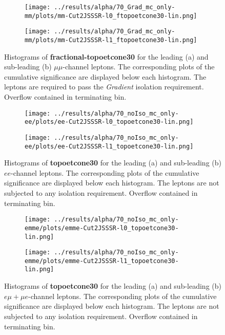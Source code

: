 \begin{figure}
\centering
\begin{subfigure}{.65\textwidth}
  \centering
  \texttt{[image: ../results/alpha/70\_Grad\_mc\_only-mm/plots/mm-Cut2JSSSR-l0\_ftopoetcone30-lin.png]}
  \caption{}
  \label{mm_leading_topoetcone}
\end{subfigure}
\begin{subfigure}{.65\textwidth}
 \centering
  \texttt{[image: ../results/alpha/70\_Grad\_mc\_only-mm/plots/mm-Cut2JSSSR-l1\_ftopoetcone30-lin.png]}
  \caption{}
  \label{mm_subleading_topoetcone}
\end{subfigure}
\caption{Histograms of \textbf{fractional-topoetcone30} for the leading (a) and sub-leading (b) $\mu\mu$-channel leptons. The corresponding plots of the cumulative significance are displayed below each histogram. The leptons are required to pass the \textit{Gradient} isolation requirement. Overflow contained in terminating bin.}
\label{ftopoetcone30_isoplots_wGrad_mm}
\end{figure}
\begin{figure}
\centering
\begin{subfigure}{.65\textwidth}
  \centering
  \texttt{[image: ../results/alpha/70\_noIso\_mc\_only-ee/plots/ee-Cut2JSSSR-l0\_topoetcone30-lin.png]}
  \caption{}
  \label{ee_leading_topoetcone}
\end{subfigure}
\begin{subfigure}{.65\textwidth}
 \centering
  \texttt{[image: ../results/alpha/70\_noIso\_mc\_only-ee/plots/ee-Cut2JSSSR-l1\_topoetcone30-lin.png]}
  \caption{}
  \label{ee_subleading_topoetcone}
\end{subfigure}
\caption{Histograms of \textbf{topoetcone30} for the leading (a) and sub-leading (b) $ee$-channel leptons. The corresponding plots of the cumulative significance are displayed below each histogram. The leptons are not subjected to any isolation requirement. Overflow contained in terminating bin.}
\label{topoetcone30_isoplots_noIso_ee}
\end{figure}
\begin{figure}
\centering
\begin{subfigure}{.65\textwidth}
  \centering
  \texttt{[image: ../results/alpha/70\_noIso\_mc\_only-emme/plots/emme-Cut2JSSSR-l0\_topoetcone30-lin.png]}
  \caption{}
  \label{emme_leading_topoetcone}
\end{subfigure}
\begin{subfigure}{.65\textwidth}
 \centering
  \texttt{[image: ../results/alpha/70\_noIso\_mc\_only-emme/plots/emme-Cut2JSSSR-l1\_topoetcone30-lin.png]}
  \caption{}
  \label{emme_subleading_topoetcone}
\end{subfigure}
\caption{Histograms of \textbf{topoetcone30} for the leading (a) and sub-leading (b) $e\mu+\mu e$-channel leptons. The corresponding plots of the cumulative significance are displayed below each histogram. The leptons are not subjected to any isolation requirement. Overflow contained in terminating bin.}
\label{topoetcone30_isoplots_noIso_emme}
\end{figure}
